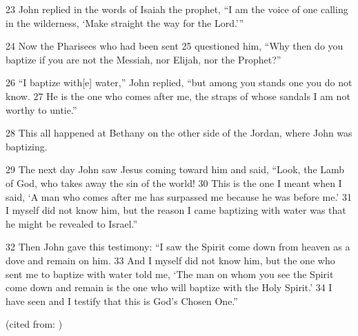 \begin{englishabstract}
23 John replied in the words of Isaiah the prophet, “I am the voice of one calling in the wilderness, ‘Make straight the way for the Lord.’”

24 Now the Pharisees who had been sent 25 questioned him, “Why then do you baptize if you are not the Messiah, nor Elijah, nor the Prophet?”

26 “I baptize with[e] water,” John replied, “but among you stands one you do not know. 27 He is the one who comes after me, the straps of whose sandals I am not worthy to untie.”

28 This all happened at Bethany on the other side of the Jordan, where John was baptizing.

29 The next day John saw Jesus coming toward him and said, “Look, the Lamb of God, who takes away the sin of the world! 30 This is the one I meant when I said, ‘A man who comes after me has surpassed me because he was before me.’ 31 I myself did not know him, but the reason I came baptizing with water was that he might be revealed to Israel.”

32 Then John gave this testimony: “I saw the Spirit come down from heaven as a dove and remain on him. 33 And I myself did not know him, but the one who sent me to baptize with water told me, ‘The man on whom you see the Spirit come down and remain is the one who will baptize with the Holy Spirit.’ 34 I have seen and I testify that this is God’s Chosen One.”

(cited from: {})

\end{englishabstract}